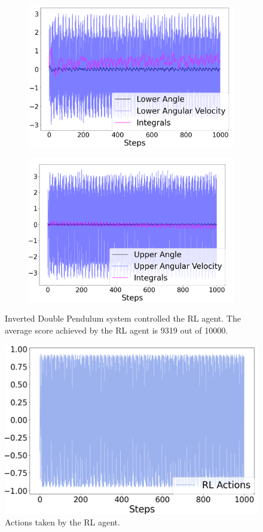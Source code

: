 \documentclass{IJCAS}
\begin{document}
\begin{figure}[H]
\centering
\begin{subfigure}{0.3\textwidth}
\centering
\includegraphics[width=\linewidth]{double_RL.png}
\end{subfigure}
\begin{subfigure}{0.3\textwidth}
\centering
\includegraphics[width=\linewidth]{double_RL_upper.png}
\end{subfigure}
\caption{Inverted Double Pendulum system controlled the RL agent. The average score achieved by the RL agent is 9319 out of 10000. }
\label{fig:double_rl}
\end{figure}


\begin{figure}[H]
\centering
\includegraphics[width=.3\textwidth]{double_RL_actions.png}
\caption{Actions taken by the RL agent.}
\label{fig:double_rl_actions}
\end{figure}
\end{document}

